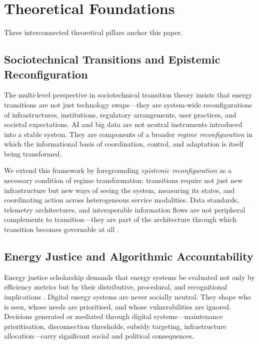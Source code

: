 \documentclass[preprint,12pt]{elsarticle}
\begin{document}
\section{Theoretical Foundations}
\label{sec:theory}

Three interconnected theoretical pillars anchor this paper.

\subsection{Sociotechnical Transitions and Epistemic
Reconfiguration}

The multi-level perspective in sociotechnical transition theory
\cite{Geels2002} insists that energy transitions are not just
technology swaps---they are system-wide reconfigurations of
infrastructures, institutions, regulatory arrangements, user
practices, and societal expectations. AI and big data are
not neutral instruments introduced into a stable system. They
are components of a broader \textit{regime reconfiguration}
in which the informational basis of coordination, control, and
adaptation is itself being transformed.

We extend this framework by foregrounding
\textit{epistemic reconfiguration} as a necessary condition
of regime transformation: transitions require not just new
infrastructure but new ways of seeing the system, measuring
its states, and coordinating action across heterogeneous
service modalities. Data standards, telemetry architectures,
and interoperable information flows are not peripheral
complements to transition---they are part of the architecture
through which transition becomes governable at all \cite{Kitchin2014}.

\subsection{Energy Justice and Algorithmic Accountability}

Energy justice scholarship demands that energy systems be
evaluated not only by efficiency metrics but by their
distributive, procedural, and recognitional implications
\cite{Sovacool2015}. Digital energy systems are never socially
neutral. They shape who is seen, whose needs are prioritised,
and whose vulnerabilities are ignored. Decisions generated
or mediated through digital systems---maintenance
prioritisation, disconnection thresholds, subsidy targeting,
infrastructure allocation---carry significant social and
political consequences.
\end{document}

